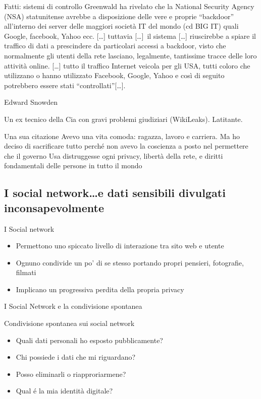 \documentclass[italian]{beamer}
\begin{document}
\begin{frame}{Fatti: sistemi di controllo}
	Greenwald ha rivelato che la National Security Agency (NSA) statunitense avrebbe a disposizione delle vere e proprie \alert<2>{``backdoor''} all’interno dei server delle maggiori società IT del mondo (cd BIG IT) quali Google, facebook, Yahoo ecc. {[}\ldots{]} tuttavia {[}\ldots{]}\ il sistema {[}\ldots{]} riuscirebbe a spiare il traffico di dati a prescindere da particolari accessi a backdoor, visto che normalmente gli utenti della rete lasciano, legalmente, tantissime tracce delle loro attività online. {[}\ldots{]} \alert<3>{tutto il traffico Internet veicola per gli USA}, tutti coloro che utilizzano o hanno utilizzato Facebook, Google, Yahoo e così di seguito \alert<3>{potrebbero essere stati ``controllati''}{[}\ldots{]}.
\end{frame}


\begin{frame}{Edward Snowden}
	
	Un ex tecnico della Cia con gravi problemi giudiziari (WikiLeaks). Latitante.
	
	\begin{block}{Una sua citazione}
		Avevo una vita comoda: ragazza, lavoro e carriera. Ma ho deciso di sacrificare tutto perché non avevo la coscienza a posto nel permettere che il governo Usa distruggesse ogni privacy, libertà della rete, e diritti fondamentali delle persone in tutto il mondo
	\end{block}
\end{frame}

\subsection{I social network\ldots e dati sensibili divulgati inconsapevolmente}

\begin{frame}{I Social network}
	\begin{itemize}
		\item Permettono uno spiccato livello di interazione tra sito web e utente
		\item Ognuno condivide un po’ di se stesso portando propri pensieri, fotografie, filmati
		\item Implicano un progressiva perdita della propria privacy
	\end{itemize}
\end{frame}

\begin{frame}{I Social Network e la condivisione spontanea}
	\begin{block}{Condivisione spontanea sui social network}
		\begin{itemize}
			\item Quali dati personali ho esposto pubblicamente?
			\item Chi possiede i dati che mi riguardano?
			\item Posso eliminarli o riapproriarmene?
			\item Qual \'e la mia identit\`a digitale?
		\end{itemize}
	\end{block}
\end{frame}
\end{document}
